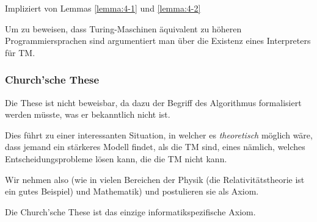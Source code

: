 \inlineproof Impliziert von Lemmas \ref{lemma:4-1} und \ref{lemma:4-2}

Um zu beweisen, dass Turing-Maschinen äquivalent zu höheren Programmiersprachen sind argumentiert man über die Existenz eines Interpreters für TM.


\subsubsection{Church'sche These}
\begin{center}
\end{center}
Die These ist nicht beweisbar, da dazu der Begriff des Algorithmus formalisiert werden müsste, was er bekanntlich nicht ist.

Dies führt zu einer interessanten Situation, in welcher es \textit{theoretisch} möglich wäre, dass jemand ein stärkeres Modell findet, als die TM sind,
eines nämlich, welches Entscheidungsprobleme lösen kann, die die TM nicht kann.

Wir nehmen also (wie in vielen Bereichen der Physik (die Relativitätstheorie ist ein gutes Beispiel) und Mathematik) und postulieren sie als Axiom.

 Die Church'sche These ist das einzige informatikspezifische Axiom.
